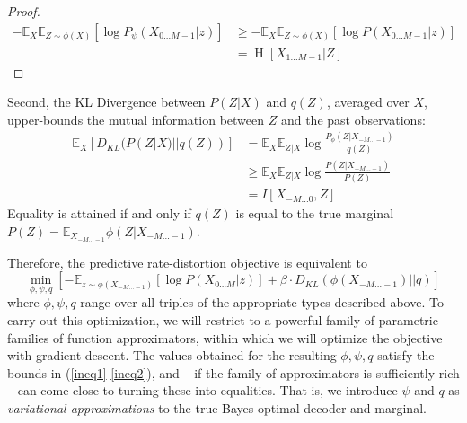 \documentclass[11pt,letterpaper]{article}
\newcommand{\E}[0]{\mathbb{E}}
\begin{document}
\begin{proof}
\begin{align*}
	-	\mathbb{E}_{X}\mathbb{E}_{Z \sim \phi(X)}\left[\log P_\psi(X_{0\dots M-1} | z)\right] & \geq -	\mathbb{E}_{X}\mathbb{E}_{Z \sim \phi(X)}\left[\log P(X_{0\dots M-1} | z)\right]\\
	&= \operatorname{H}[X_{1\dots M-1}|Z]
\end{align*}
\end{proof}

Second, the KL Divergence between $P(Z|X)$ and $q(Z)$, averaged over $X$, upper-bounds the mutual information between $Z$ and the past observations:
\begin{equation}\label{ineq2}
\begin{aligned}
	\mathbb{E}_{X}\left[ D_{KL}(P(Z|X) || q(Z))\right] &=   \mathbb{E}_{X} \mathbb{E}_{Z|X} \log \frac{P_\phi(Z|X_{-M\dots -1})}{q(Z)}  \\
	& \geq  \mathbb{E}_{X} \mathbb{E}_{Z|X} \log \frac{P(Z|X_{-M\dots -1})}{P(Z)}  \\
	& = I[X_{-M\dots 0},Z] 
\end{aligned}
\end{equation}
Equality is attained if and only if $q(Z)$ is equal to the true marginal $P(Z) = \E_{X_{-M \dots -1}} \phi(Z|X_{-M \dots -1})$.


Therefore, the predictive rate-distortion objective is equivalent to
\begin{equation}\label{eq:bound}
	\min_{\phi, \psi, q}	\left[-	\mathbb{E}_{z \sim \phi(X_{-M\dots-1})}\left[\log P(X_{0\dots M} | z)\right] + \beta \cdot D_{KL}(\phi(X_{-M\dots-1}) || q)\right]
\end{equation}
where $\phi, \psi, q$ range over all triples of the appropriate types described above.
To carry out this optimization, we will restrict to a powerful family of parametric families of function approximators, within which we will optimize the objective with gradient descent.
The values obtained for the resulting $\phi, \psi, q$ satisfy the bounds in (\ref{ineq1}-\ref{ineq2}), and -- if the family of approximators is sufficiently rich -- can come close to turning these into equalities.
That is, we introduce $\psi$ and $q$ as \emph{variational approximations} \citep{blei-variational-2016} to the true Bayes optimal decoder and marginal.
\end{document}
